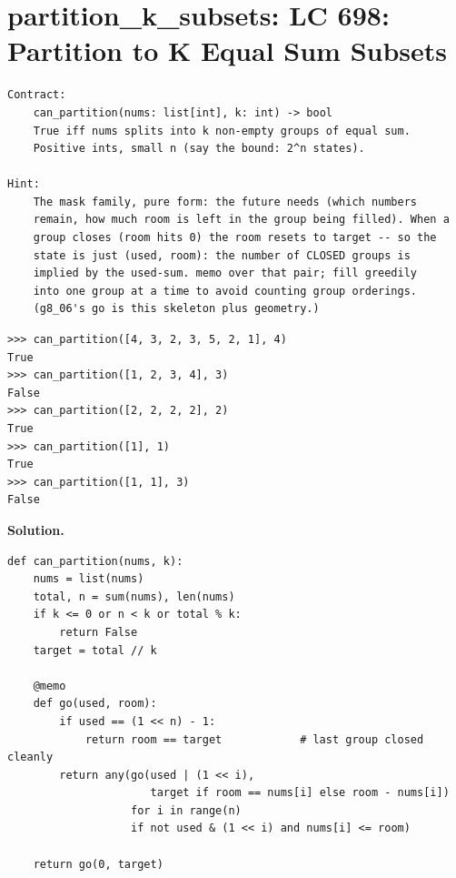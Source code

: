 \documentclass[10pt,letterpaper]{book}
\begin{document}
\section{partition\_k\_subsets: LC 698: Partition to K Equal Sum Subsets}
\begin{lstlisting}[style=ex]
Contract:
    can_partition(nums: list[int], k: int) -> bool
    True iff nums splits into k non-empty groups of equal sum.
    Positive ints, small n (say the bound: 2^n states).

Hint:
    The mask family, pure form: the future needs (which numbers
    remain, how much room is left in the group being filled). When a
    group closes (room hits 0) the room resets to target -- so the
    state is just (used, room): the number of CLOSED groups is
    implied by the used-sum. memo over that pair; fill greedily
    into one group at a time to avoid counting group orderings.
    (g8_06's go is this skeleton plus geometry.)
\end{lstlisting}
\begin{lstlisting}[style=ex]
>>> can_partition([4, 3, 2, 3, 5, 2, 1], 4)
True
>>> can_partition([1, 2, 3, 4], 3)
False
>>> can_partition([2, 2, 2, 2], 2)
True
>>> can_partition([1], 1)
True
>>> can_partition([1, 1], 3)
False
\end{lstlisting}
\noindent\textbf{Solution.}
\begin{lstlisting}[style=code]
def can_partition(nums, k):
    nums = list(nums)
    total, n = sum(nums), len(nums)
    if k <= 0 or n < k or total % k:
        return False
    target = total // k

    @memo
    def go(used, room):
        if used == (1 << n) - 1:
            return room == target            # last group closed cleanly
        return any(go(used | (1 << i),
                      target if room == nums[i] else room - nums[i])
                   for i in range(n)
                   if not used & (1 << i) and nums[i] <= room)

    return go(0, target)
\end{lstlisting}
\end{document}
